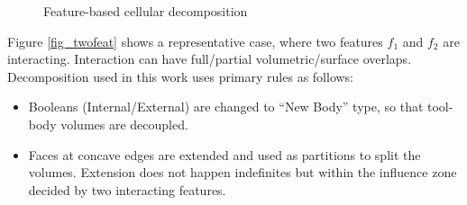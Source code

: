 \begin{figure}[!h]
\centering     %
{}
 \quad
{}
\caption{ Feature-based cellular decomposition}
\label{fig_fbcd}
\end{figure}

Figure \ref{fig_twofeat} shows a representative case, where two features $f_1$ and $f_2$ are interacting. Interaction can have full/partial volumetric/surface overlaps. Decomposition used in this work uses primary rules as follows:
\begin{itemize}[noitemsep,topsep=2pt,parsep=2pt,partopsep=2pt]
\item Booleans (Internal/External) are changed to ``New Body'' type, so that tool-body volumes are decoupled.
\item Faces at concave edges are extended and used as partitions to split the volumes. Extension does not happen indefinites but within the influence zone decided by two interacting features.
\end{itemize}


